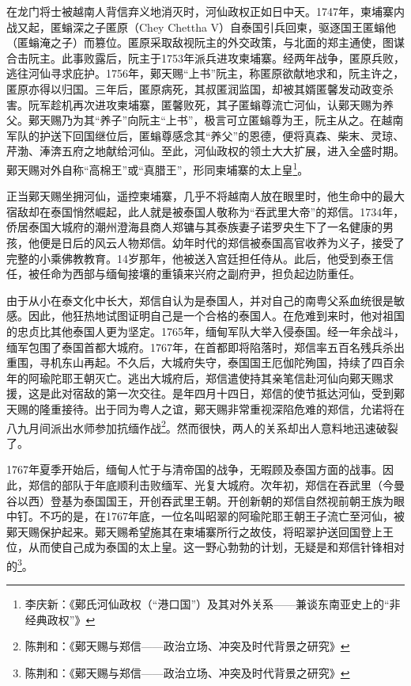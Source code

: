 在龙门将士被越南人背信弃义地消灭时，河仙政权正如日中天。1747年，柬埔寨内战又起，匿螉深之子匿原（Chey Chettha V）自泰国引兵回柬，驱逐国王匿螉他（匿螉淹之子）而篡位。匿原采取敌视阮主的外交政策，与北面的郑主通使，图谋合击阮主。此事败露后，阮主于1753年派兵进攻柬埔寨。经两年战争，匿原兵败，逃往河仙寻求庇护。1756年，鄚天赐“上书”阮主，称匿原欲献地求和，阮主许之，匿原亦得以归国。三年后，匿原病死，其叔匿润监国，却被其婿匿馨发动政变杀害。阮军趁机再次进攻柬埔寨，匿馨败死，其子匿螉尊流亡河仙，认鄚天赐为养父。鄚天赐乃为其“养子”向阮主“上书”，极言可立匿螉尊为王，阮主从之。在越南军队的护送下回国继位后，匿螉尊感念其“养父”的恩德，便将真森、柴末、灵琼、芹渤、淎渀五府之地献给河仙。至此，河仙政权的领土大大扩展，进入全盛时期。鄚天赐对外自称“高棉王”或“真腊王”，形同柬埔寨的太上皇\footnote{李庆新：《鄚氏河仙政权（“港口国”）及其对外关系——兼谈东南亚史上的“非经典政权”》}。

正当鄚天赐坐拥河仙，遥控柬埔寨，几乎不将越南人放在眼里时，他生命中的最大宿敌却在泰国悄然崛起，此人就是被泰国人敬称为“吞武里大帝”的郑信。1734年，侨居泰国大城府的潮州澄海县商人郑镛与其泰族妻子诺罗央生下了一名健康的男孩，他便是日后的风云人物郑信。幼年时代的郑信被泰国高官收养为义子，接受了完整的小乘佛教教育。14岁那年，他被送入宫廷担任侍从。此后，他受到泰王信任，被任命为西部与缅甸接壤的重镇来兴府之副府尹，担负起边防重任。

由于从小在泰文化中长大，郑信自认为是泰国人，并对自己的南粤父系血统很是敏感。因此，他狂热地试图证明自己是一个合格的泰国人。在危难到来时，他对祖国的忠贞比其他泰国人更为坚定。1765年，缅甸军队大举入侵泰国。经一年余战斗，缅军包围了泰国首都大城府。1767年，在首都即将陷落时，郑信率五百名残兵杀出重围，寻机东山再起。不久后，大城府失守，泰国国王厄伽陀殉国，持续了四百余年的阿瑜陀耶王朝灭亡。逃出大城府后，郑信遣使持其亲笔信赴河仙向鄚天赐求援，这是此对宿敌的第一次交往。是年四月十四日，郑信的使节抵达河仙，受到鄚天赐的隆重接待。出于同为粤人之谊，鄚天赐非常重视深陷危难的郑信，允诺将在八九月间派出水师参加抗缅作战\footnote{陈荆和：《鄚天赐与郑信——政治立场、冲突及时代背景之研究》}。然而很快，两人的关系却出人意料地迅速破裂了。

1767年夏季开始后，缅甸人忙于与清帝国的战争，无暇顾及泰国方面的战事。因此，郑信的部队于年底顺利击败缅军、光复大城府。次年初，郑信在吞武里（今曼谷以西）登基为泰国国王，开创吞武里王朝。开创新朝的郑信自然视前朝王族为眼中钉。不巧的是，在1767年底，一位名叫昭翠的阿瑜陀耶王朝王子流亡至河仙，被鄚天赐保护起来。鄚天赐希望施其在柬埔寨所行之故伎，将昭翠护送回国登上王位，从而使自己成为泰国的太上皇。这一野心勃勃的计划，无疑是和郑信针锋相对的\footnote{陈荆和：《鄚天赐与郑信——政治立场、冲突及时代背景之研究》}。

